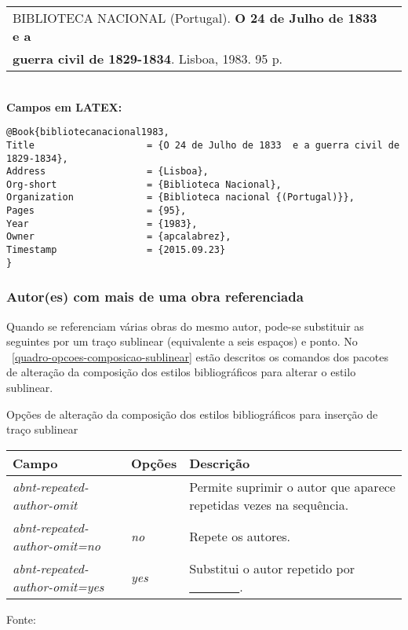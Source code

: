 \begin{tabular}{|l|c|} \hline
BIBLIOTECA NACIONAL (Portugal). \textbf{O 24 de Julho de 1833 e a} \\ \textbf{guerra civil de 1829-1834}. Lisboa, 1983. 95 p.   \\\hline
\end{tabular}\\

\textbf{Campos em LATEX:}

\begin{verbatim}
@Book{bibliotecanacional1983,
Title                    = {O 24 de Julho de 1833  e a guerra civil de 
1829-1834},
Address                  = {Lisboa},
Org-short                = {Biblioteca Nacional},
Organization             = {Biblioteca nacional {(Portugal)}},
Pages                    = {95},
Year                     = {1983},
Owner                    = {apcalabrez},
Timestamp                = {2015.09.23}
}
\end{verbatim}
\subsubsection{Autor(es) com mais de uma obra referenciada}

Quando se referenciam várias obras do mesmo autor, pode-se substituir
as seguintes por um traço sublinear (equivalente a seis espaços) e
ponto. 
No ~\autoref{quadro-opcoes-composicao-sublinear} estão descritos os comandos dos pacotes de alteração da composição dos estilos bibliográficos para alterar o estilo sublinear.

\begin{quadro}[H]
	\caption{\label{quadro-opcoes-composicao-sublinear}Opções de alteração da composição dos estilos bibliográficos para inserção de traço sublinear}
		\begin{tabular}{|p{4.0cm}|p{2.0cm}|p{8.5cm}|}
			\hline
			\textbf{Campo} & \textbf{Opções} & \textbf{Descrição} \\ 
			\hline
			\emph{abnt-repeated-author-omit} &   & Permite suprimir o autor que aparece
			repetidas vezes na sequência.\\
			\hline
			\emph{abnt-repeated-author-omit=no} & \emph{no} & Repete os autores. \\
			\hline
			\emph{abnt-repeated-author-omit=yes} & \emph{yes} & Substitui o autor repetido por \underline{\ \ \ \ \ \ \ \ }. \\
			\hline	
		\end{tabular}
	\begin{flushleft}
	Fonte: 
	\end{flushleft}	
\end{quadro}

